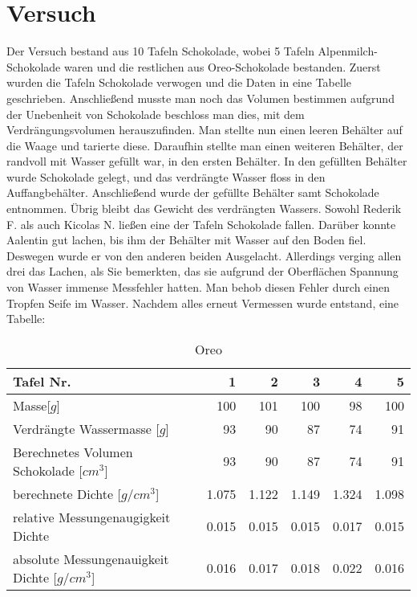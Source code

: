 \documentclass[12pt]{scrartcl}
\begin{document}
\section{Versuch}
Der Versuch bestand aus 10 Tafeln Schokolade, wobei 5 Tafeln Alpenmilch-Schokolade waren und die restlichen aus Oreo-Schokolade bestanden. Zuerst wurden die Tafeln Schokolade verwogen und die Daten in eine Tabelle geschrieben. Anschließend musste man noch das Volumen bestimmen aufgrund der Unebenheit von Schokolade beschloss man dies, mit dem Verdrängungsvolumen herauszufinden. Man stellte nun einen leeren Behälter auf die Waage und tarierte diese. Daraufhin stellte man einen weiteren Behälter, der randvoll mit Wasser gefüllt war, in den ersten Behälter. In den gefüllten Behälter wurde Schokolade gelegt, und das verdrängte Wasser floss in den Auffangbehälter. Anschließend wurde der gefüllte Behälter samt Schokolade entnommen. Übrig bleibt das Gewicht des verdrängten Wassers. Sowohl Rederik F. als auch Kicolas N. ließen eine der Tafeln Schokolade fallen. Darüber konnte Aalentin gut lachen, bis ihm der Behälter mit Wasser auf den Boden fiel. Deswegen wurde er von den anderen beiden Ausgelacht. Allerdings verging allen drei das Lachen, als Sie bemerkten, das sie aufgrund der Oberflächen Spannung von Wasser immense Messfehler hatten. Man behob diesen Fehler durch einen Tropfen Seife im Wasser. Nachdem alles erneut Vermessen wurde entstand, eine Tabelle:
	\begin{table}[h!]
	  \center
	  \caption{Oreo}
      \label{tab:oreo}	  
      \begin{tabular}{l|r|r|r|r|r}
      \toprule
      Tafel Nr. & 1 & 2 & 3 & 4 & 5\\
      \midrule
      Masse[$g$] & 100 & 101 & 100 & 98 & 100\\
      \midrule
      Verdrängte Wassermasse [$g$] & 93 & 90 & 87 & 74 & 91\\
      \midrule
      Berechnetes Volumen Schokolade [$cm^3$] & 93 & 90 & 87 & 74 & 91\\
      \midrule
      berechnete Dichte [$g/cm^3$] & 1.075 & 1.122 & 1.149 & 1.324 & 1.098 \\
      \midrule
      relative Messungenaugigkeit Dichte & 0.015 & 0.015 & 0.015 & 0.017 & 0.015 \\
      \midrule
      absolute Messungenauigkeit Dichte [$g/cm^3$] & 0.016 & 0.017 & 0.018 & 0.022 & 0.016 \\
      \bottomrule
      \end{tabular}
	\end{table}
\end{document}
